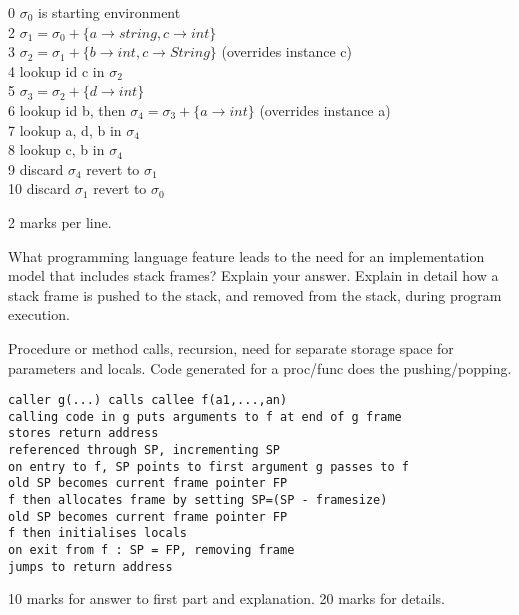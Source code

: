 \documentclass[11pt]{bareexam}
\begin{document}
\begin{questions}
\begin{subquestions}
\begin{modelanswer}
0  $\sigma_0$ is starting environment\\
2  $\sigma_1 = \sigma_0 + \{a\rightarrow string,c\rightarrow int\}$\\
3  $\sigma_2 = \sigma_1 + \{b\rightarrow int,c\rightarrow String\}$ (overrides instance c)\\
4  lookup id c  in $\sigma_2$\\
5  $\sigma_3 = \sigma_2 + \{d\rightarrow int\}$ \\
6  lookup id b, then $\sigma_4 = \sigma_3 + \{a\rightarrow int\}$ (overrides instance a)\\
7  lookup a, d, b  in $\sigma_4$\\
8  lookup c, b in $\sigma_4$\\
9  discard $\sigma_4$ revert to $\sigma_1$\\
10 discard $\sigma_1$ revert to $\sigma_0$


2 marks per line.
\end{modelanswer}


\end{subquestions}

\newpage

\question


\begin{subquestions}
\subquestion
What programming language feature leads to the need for an
implementation model that includes stack frames? Explain your answer.
Explain in detail how a stack frame is pushed to the stack, and 
removed from the stack, during program execution. 

\begin{modelanswer}
Procedure or method calls, recursion, need for separate storage space for
parameters and locals.
Code generated for a proc/func does the pushing/popping.
\begin{verbatim}
caller g(...) calls callee f(a1,...,an)
calling code in g puts arguments to f at end of g frame
stores return address
referenced through SP, incrementing SP
on entry to f, SP points to first argument g passes to f
old SP becomes current frame pointer FP
f then allocates frame by setting SP=(SP - framesize)
old SP becomes current frame pointer FP
f then initialises locals
on exit from f : SP = FP, removing frame
jumps to return address
\end{verbatim}
10 marks for answer to first part and explanation. 20 marks for details.
\end{modelanswer}


\end{subquestions}
\end{questions}
\end{document}

